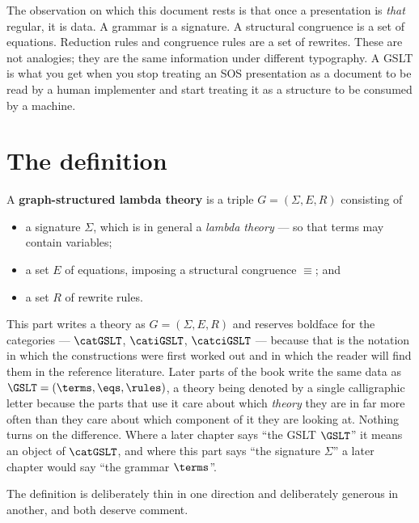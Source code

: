 The observation on which this document rests is that once a presentation is
\emph{that} regular, it is data. A grammar is a signature. A structural congruence is a
set of equations. Reduction rules and congruence rules are a set of rewrites. These are
not analogies; they are the same information under different typography. A GSLT is what
you get when you stop treating an SOS presentation as a document to be read by a human
implementer and start treating it as a structure to be consumed by a machine.

\section{The definition}

\begin{definition}
\label{ob:def:gslt}
A \textbf{graph-structured lambda theory} is a triple $G = (\Sigma, E, R)$ consisting of
\begin{itemize}[leftmargin=2em]
  \item a signature $\Sigma$, which is in general a \emph{lambda theory} --- so that
    terms may contain variables;
  \item a set $E$ of equations, imposing a structural congruence $\equiv$; and
  \item a set $R$ of rewrite rules.
\end{itemize}
\end{definition}

\begin{remark}
\label{ob:rmk:notation-bridge}
This part writes a theory as $G = (\Sigma, E, R)$ and reserves boldface
for the categories --- $\catGSLT$, $\catiGSLT$, $\catciGSLT$ --- because
that is the notation in which the constructions were first worked out and
in which the reader will find them in the reference literature.
Later parts of the book write the same data as
$\GSLT = (\terms, \eqs, \rules)$, a theory being denoted by a single
calligraphic letter because the parts that use it care about which
\emph{theory} they are in far more often than they care about which
component of it they are looking at.
Nothing turns on the difference.
Where a later chapter says ``the GSLT $\GSLT$'' it means an object of
$\catGSLT$, and where this part says ``the signature $\Sigma$'' a later
chapter would say ``the grammar $\terms$''.
\end{remark}

The definition is deliberately thin in one direction and deliberately generous in
another, and both deserve comment.

